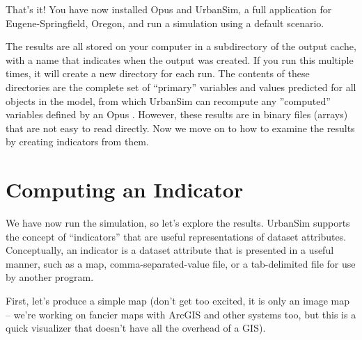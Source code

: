 \documentclass{howto}
\begin{document}
That's it!  You have now installed Opus and UrbanSim, a full
application for Eugene-Springfield, Oregon, and run a simulation
using a default scenario.

The results are all stored on your computer in a subdirectory of the
output cache, with a name that indicates when the output was
created. If you run this multiple times, it will create a new
directory for each run.  The contents of these directories are the
complete set of ``primary'' variables and values predicted for all objects in
the model, from which UrbanSim can recompute any ''computed'' variables defined
by an Opus .  However, these results are in binary files (arrays) that
are not easy to read directly.  Now we move on to how to examine the results by
creating indicators from them.

\section*{Computing an Indicator}

We have now run the simulation, so let's explore the results.
UrbanSim supports the concept of ``indicators'' that are useful
representations of dataset attributes.  Conceptually, an indicator
is a dataset attribute that is presented in a useful manner, such as
a map, comma-separated-value file, or a tab-delimited file for use by
another program.

First, let's produce a simple map (don't get too excited, it is only
an image map -- we're working on fancier maps with ArcGIS and other
systems too, but this is a quick visualizer that doesn't have all
the overhead of a GIS).
\end{document}

